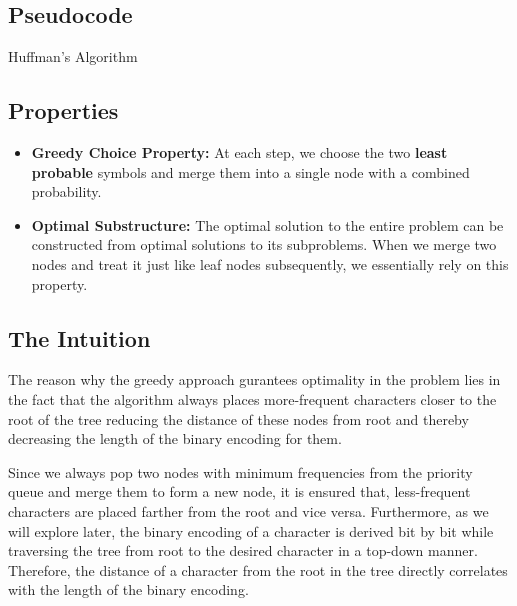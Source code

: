\documentclass[18pt]{article}
\begin{document}
\subsection{Pseudocode}

\begin{algorithm}[H]
	\SetAlgoLined
	\DontPrintSemicolon
	\caption{Huffman's Algorithm}
\end{algorithm}

\subsection{Properties}

\begin{itemize}
	
	\item \textbf{Greedy Choice Property:} At each step, we choose the two \textbf{least probable} symbols and merge them into a single node with a combined probability.
	
	\item \textbf{Optimal Substructure:} The optimal solution to the entire problem can be constructed from optimal solutions to its subproblems. When we merge two nodes and treat it just like leaf nodes subsequently, we essentially rely on this property.
	
\end{itemize}

\subsection{The Intuition}

The reason why the greedy approach gurantees optimality in the problem lies in the fact that the algorithm always places more-frequent characters closer
to the root of the tree reducing the distance of these nodes from root and thereby decreasing the length of the binary encoding for them.

Since we always pop two nodes with minimum frequencies from the priority queue and merge them to form a new node, it is ensured that, less-frequent characters are placed farther from the root and vice versa. Furthermore, as we will explore later, the binary encoding of a character is derived bit by bit while traversing the tree from root to the desired character in a top-down manner. Therefore, the distance of a character from the root in the tree directly correlates with the length of the binary encoding.
\end{document}
